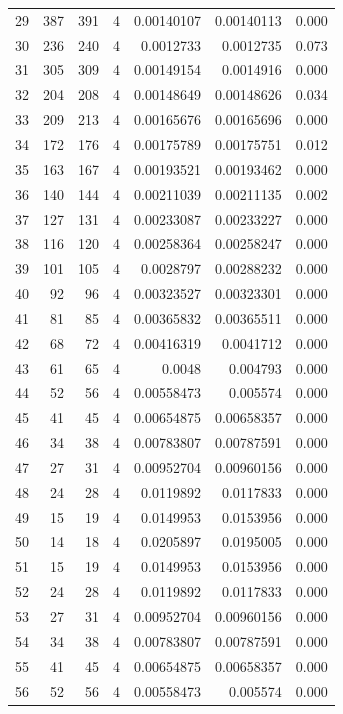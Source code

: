 \begin{tabular}{r r r r r r r}
29 & 387 & 391 & 4 & 0.00140107 & 0.00140113 & 0.000 \\
30 & 236 & 240 & 4 & 0.0012733 & 0.0012735 & 0.073 \\
31 & 305 & 309 & 4 & 0.00149154 & 0.0014916 & 0.000 \\
32 & 204 & 208 & 4 & 0.00148649 & 0.00148626 & 0.034 \\
33 & 209 & 213 & 4 & 0.00165676 & 0.00165696 & 0.000 \\
34 & 172 & 176 & 4 & 0.00175789 & 0.00175751 & 0.012 \\
35 & 163 & 167 & 4 & 0.00193521 & 0.00193462 & 0.000 \\
36 & 140 & 144 & 4 & 0.00211039 & 0.00211135 & 0.002 \\
37 & 127 & 131 & 4 & 0.00233087 & 0.00233227 & 0.000 \\
38 & 116 & 120 & 4 & 0.00258364 & 0.00258247 & 0.000 \\
39 & 101 & 105 & 4 & 0.0028797 & 0.00288232 & 0.000 \\
40 & 92 & 96 & 4 & 0.00323527 & 0.00323301 & 0.000 \\
41 & 81 & 85 & 4 & 0.00365832 & 0.00365511 & 0.000 \\
42 & 68 & 72 & 4 & 0.00416319 & 0.0041712 & 0.000 \\
43 & 61 & 65 & 4 & 0.0048 & 0.004793 & 0.000 \\
44 & 52 & 56 & 4 & 0.00558473 & 0.005574 & 0.000 \\
45 & 41 & 45 & 4 & 0.00654875 & 0.00658357 & 0.000 \\
46 & 34 & 38 & 4 & 0.00783807 & 0.00787591 & 0.000 \\
47 & 27 & 31 & 4 & 0.00952704 & 0.00960156 & 0.000 \\
48 & 24 & 28 & 4 & 0.0119892 & 0.0117833 & 0.000 \\
49 & 15 & 19 & 4 & 0.0149953 & 0.0153956 & 0.000 \\
50 & 14 & 18 & 4 & 0.0205897 & 0.0195005 & 0.000 \\
51 & 15 & 19 & 4 & 0.0149953 & 0.0153956 & 0.000 \\
52 & 24 & 28 & 4 & 0.0119892 & 0.0117833 & 0.000 \\
53 & 27 & 31 & 4 & 0.00952704 & 0.00960156 & 0.000 \\
54 & 34 & 38 & 4 & 0.00783807 & 0.00787591 & 0.000 \\
55 & 41 & 45 & 4 & 0.00654875 & 0.00658357 & 0.000 \\
56 & 52 & 56 & 4 & 0.00558473 & 0.005574 & 0.000 \\

\end{tabular}
